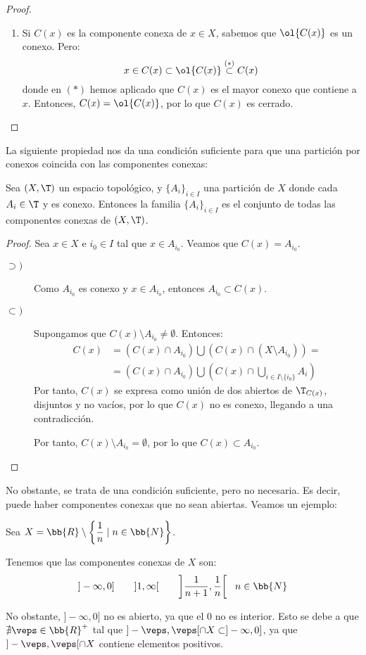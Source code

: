\begin{proof}
\begin{enumerate}
        \item Si $C(x)$ es la componente conexa de $x\in X$, sabemos que $\ol{C(x)}$ es un conexo. Pero:
        \begin{equation*}
            x\in C(x)\subset \ol{C(x)} \stackrel{(\ast)}{\subset} C(x)
        \end{equation*}
        donde en $(\ast)$ hemos aplicado que $C(x)$ es el mayor conexo que contiene a $x$. Entonces, $C(x)=\ol{C(x)}$, por lo que $C(x)$ es cerrado.
    \end{enumerate}
\end{proof}

La siguiente propiedad nos da una condición suficiente para que una partición por conexos coincida con las componentes conexas:
\begin{prop}
    Sea $(X,\T)$ un espacio topológico, y $\{A_i\}_{i\in I}$ una partición de $X$ donde cada $A_i\in \T$ y es conexo. Entonces la familia ${\{A_i\}}_{i\in I}$ es el conjunto de todas las componentes conexas de $(X,\T)$.
\end{prop}
\begin{proof}
    Sea $x\in X$ e $i_0\in I$ tal que $x\in A_{i_0}$. Veamos que $C(x)=A_{i_0}$.
    \begin{description}
        \item[$\supset)$] Como $A_{i_0}$ es conexo y $x\in A_{i_0}$, entonces $A_{i_0}\subset C(x)$.
        \item[$\subset)$] Supongamos que $C(x)\setminus A_{i_0}\neq \emptyset$. Entonces:
        \begin{align*}
            C(x) &= (C(x)\cap A_{i_0}) \bigcup \left(C(x)\cap (X\setminus A_{i_0})\right) =\\
            &= (C(x)\cap A_{i_0}) \bigcup \left(C(x)\cap \bigcup_{i\in I\setminus \{i_0\}}A_i\right)
        \end{align*}
        Por tanto, $C(x)$ se expresa como unión de dos abiertos de $\T_{C(x)}$, disjuntos y no vacíos, por lo que $C(x)$ no es conexo, llegando a una contradicción.
        
        Por tanto, $C(x)\setminus A_{i_0}=\emptyset$, por lo que $C(x)\subset A_{i_0}$.
    \end{description}
\end{proof}

No obstante, se trata de una condición suficiente, pero no necesaria. Es decir, puede haber componentes conexas que no sean abiertas. Veamos un ejemplo:
\begin{ejemplo}
    Sea $X=\bb{R}\setminus \left\{\dfrac{1}{n}\mid n\in \bb{N}\right\}$.

    Tenemos que las componentes conexas de $X$ son:
    \begin{equation*}
        ]-\infty, 0] \qquad ]1,\infty[ \qquad \left]\dfrac{1}{n+1}, \dfrac{1}{n}\right[~~n\in \bb{N}
    \end{equation*}
    
    No obstante, $]-\infty, 0]$ no es abierto, ya que el $0$ no es interior. Esto se debe a que
    $\nexists \veps\in \bb{R}^+$ tal que $]-\veps, \veps[\cap X \subset ]-\infty, 0]$, ya que $]-\veps, \veps[\cap X$ contiene elementos positivos.
\end{ejemplo}

